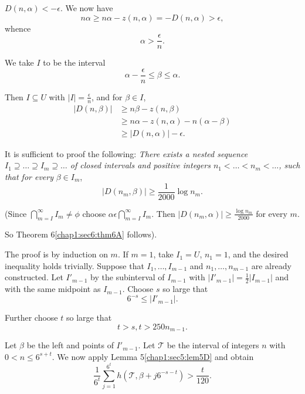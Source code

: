 \medskip
{} $D(n, \alpha) < - \epsilon$. We now have
$$
n \alpha \geq n\alpha -z(n, \alpha) = -D(n, \alpha) > \epsilon,
$$
whence
$$
\alpha > \frac{\epsilon}{n}.
$$

We take $I$ to be the interval 
$$
\alpha - \frac{\epsilon}{n} \leq \beta \leq \alpha.
$$

Then $I \subseteq U$ with $|I| = \frac{\epsilon}{n}$, and for $\beta \in I$,
\begin{align*}
|D(n, \beta)| & \geq n\beta -z(n, \beta)\\
& \geq n\alpha -z(n, \alpha) -n(\alpha - \beta)\\
& \geq |D(n, \alpha)| - \epsilon.
\end{align*}\pageoriginale

\medskip
{} It is sufficient to proof the following:
{\em There exists a nested sequence $I_{1} \supseteq \ldots \supseteq I_{m} \supseteq \ldots$ of closed intervals and positive integers $n_{1} < \ldots < n_{m} < \ldots$, such that for every} $\beta \in I_{m}$,
$$
|D(n_{m}, \beta)| \geq \frac{1}{2000} \log n_{m}.
$$

(Since $\bigcap\limits_{m=I}^{\infty} I_{m} \neq \phi$ choose $\alpha \epsilon \bigcap\limits_{m=I}^{\infty} I_{m}$. Then $|D(n_{m}, \alpha)| \geq \frac{\log n_{m}}{2000}$ for every $m$.

So Theorem 6\ref{chap1:sec6:thm6A} follows).

The proof is by induction on $m$. If $m=1$, take $I_{1} = U$, $n_{1} = 1$, and the desired inequality holds trivially. Suppose that $I_{1}, \ldots, I_{m-1}$ and $n_{1}, \ldots, n_{m-1}$ are already constructed. Let $I'_{m-1}$ by the subinterval of $I_{m-1}$ with $|I'_{m-1}| = \frac{1}{2} |I_{m-1}|$ and with the same midpoint as $I_{m-1}$. Choose $s$ so large that
\begin{equation*}
6^{-s} \leq |I'_{m-1}|.\tag{6.2}\label{chap1:sec6:eq6.2}
\end{equation*}

Further choose $t$ so large that
\begin{equation*}
t > s, t > 250 n_{m-1}.\tag{6.3}\label{chap1:sec6:eq6.3}
\end{equation*}

Let $\beta$ be the left and points of $I'_{m-1}$. Let $\mathscr{T}$ be the interval of integers $n$ with $0 < n \leq 6^{s+t}$. We now apply Lemma 5\ref{chap1:sec5:lem5D} and obtain
$$
\frac{1}{6^{t}} \sum_{j=1}^{6^{t}} h(\mathscr{T}, \beta + j 6^{-s-t}) > \frac{t}{120}.
$$

